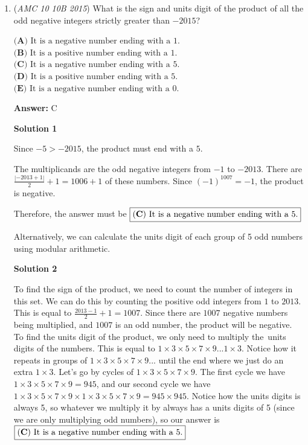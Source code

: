 \begin{enumerate}
\textbf{Solution 2}

We can reflect the figure four times to create a big circle with 2 small circles inside. We then know that the area of the 2 circles is half of the area of the big circle, meaning that the area of the 2 circles are equal to the area of the region in the big circle, but outside the small circle. Therefore the shark's fin falcata is just half of the area of the quarter-circle. We can then find the area of the quarter circle as stated above, and it is $\dfrac{9\pi}{4}$. Then the area of the shark fin's falcata is $\dfrac{9\pi}{8}$, $B$



	\item (\textit{AMC 10 10B 2015}) What is the sign and units digit of the product of all the odd negative integers strictly greater than $-2015$?


 $\textbf{(A) } \text{It is a negative number ending with a 1.}$
$\textbf{(B) } \text{It is a positive number ending with a 1.}$
$\textbf{(C) } \text{It is a negative number ending with a 5.}$
$\textbf{(D) } \text{It is a positive number ending with a 5.}$
$\textbf{(E) } \text{It is a negative number ending with a 0.}$

 \textbf{Answer: }C



\textbf{Solution 1}

Since $-5>-2015$, the product must end with a $5$.

 The multiplicands are the odd negative integers from $-1$ to $-2013$. There are $\frac{|-2013+1|}2+1=1006+1$ of these numbers. Since $(-1)^{1007}=-1$, the product is negative.

 Therefore, the answer must be $\boxed{\text{(\textbf C) It is a negative number ending with a 5.}}$

 Alternatively, we can calculate the units digit of each group of 5 odd numbers using modular arithmetic.

 



\textbf{Solution 2}

To find the sign of the product, we need to count the number of integers in this set. We can do this by counting the positive odd integers from $1$ to $2013$. This is equal to $\frac{2013-1}{2}+1=1007$. Since there are $1007$ negative numbers being multiplied, and $1007$ is an odd number, the product will be negative. To find the units digit of the product, we only need to multiply the units digits of the numbers. This is equal to $1\times3\times5\times7\times9... 1\times3$. Notice how it repeats in groups of $1\times3\times5\times7\times9...$ until the end where we just do an extra $1\times3$. Let's go by cycles of $1\times3\times5\times7\times9$. The first cycle we have $1\times3\times5\times7\times9=945$, and our second cycle we have $1\times3\times5\times7\times9\times1\times3\times5\times7\times9=945\times945$. Notice how the units digits is always 5, so whatever we multiply it by always has a units digits of 5 (since we are only multiplying odd numbers), so our answer is $\boxed{\text{(\textbf C) It is a negative number ending with a 5.}}$




\end{enumerate}
